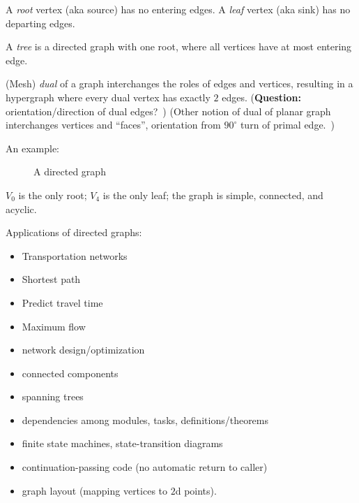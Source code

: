 \documentclass[11pt,openany]{article}
\begin{document}
A \textit{root} vertex (aka source) has no entering edges.
A \textit{leaf} vertex (aka sink) has no departing edges.

A \textit{tree} is a directed graph with one root, 
where all vertices have at most entering edge.

(Mesh) \textit{dual} of a graph interchanges the roles of edges 
and vertices, resulting in a hypergraph where every dual vertex
has exactly $2$ edges. 
(\textbf{Question:} orientation/direction of dual edges?~\cite{rusnak2012oriented})
(Other notion of dual of planar graph interchanges vertices and ``faces'',
orientation from $90^{\circ}$ turn of primal edge.~\cite{wiki:Dual_graph})

An example:
\begin{figure}
\centering
{}
\caption{A directed graph}
\label{fig:a-digraph}
\end{figure}

$V_0$ is the only root; $V_4$ is the only leaf;
the graph is simple, connected, and acyclic.

Applications of directed graphs:~\cite{clrs-2009}
\begin{itemize}
  \item Transportation networks
  \item Shortest path
  \item Predict travel time
  \item Maximum flow
  \item network design/optimization
  \item connected components
  \item spanning trees
  \item dependencies among modules, tasks, definitions/theorems
  \item finite state machines, state-transition diagrams
  \item continuation-passing code (no automatic return to caller)
  \item graph layout (mapping vertices to $2$d points).
\end{itemize}


\label{sec:Category_from_digraph}
\end{document}

